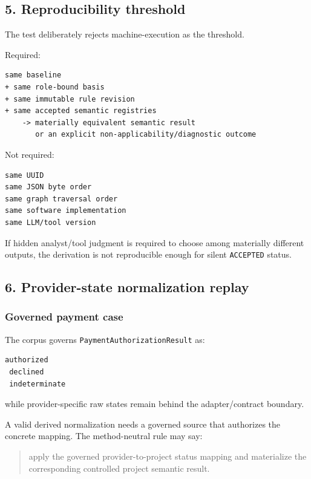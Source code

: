 \documentclass[11pt,a4paper]{article}
\begin{document}
\subsection{5. Reproducibility
threshold}\label{reproducibility-threshold}

The test deliberately rejects machine-execution as the threshold.

Required:

\begin{verbatim}
same baseline
+ same role-bound basis
+ same immutable rule revision
+ same accepted semantic registries
    -> materially equivalent semantic result
       or an explicit non-applicability/diagnostic outcome
\end{verbatim}

Not required:

\begin{verbatim}
same UUID
same JSON byte order
same graph traversal order
same software implementation
same LLM/tool version
\end{verbatim}

If hidden analyst/tool judgment is required to choose among materially
different outputs, the derivation is not reproducible enough for silent
\texttt{ACCEPTED} status.

\subsection{6. Provider-state normalization
replay}\label{provider-state-normalization-replay}

\subsubsection{Governed payment case}\label{governed-payment-case}

The corpus governs \texttt{PaymentAuthorizationResult} as:

\begin{verbatim}
authorized
 declined
 indeterminate
\end{verbatim}

while provider-specific raw states remain behind the adapter/contract
boundary.

A valid derived normalization needs a governed source that authorizes
the concrete mapping. The method-neutral rule may say:

\begin{quote}
apply the governed provider-to-project status mapping and materialize
the corresponding controlled project semantic result.
\end{quote}
\end{document}
